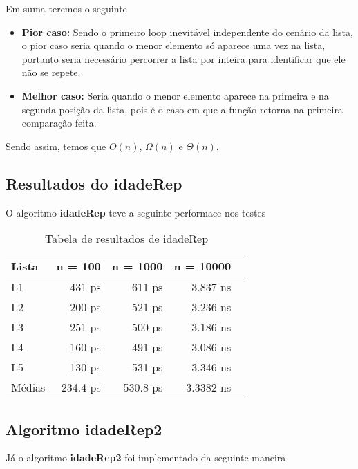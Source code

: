 Em suma teremos o seguinte

\begin{itemize}
	\item \textbf{Pior caso:} Sendo o primeiro loop inevitável independente do cenário da lista, o pior caso seria quando o menor elemento só aparece uma vez na lista, portanto seria necessário percorrer a lista por inteira para identificar que ele não se repete.

	\item \textbf{Melhor caso:} Seria quando o menor elemento aparece na primeira e na segunda posição da lista, pois é o caso em que a função retorna na primeira comparação feita.
\end{itemize}

Sendo assim, temos que $O(n)$, $\Omega(n)$ e $\Theta(n)$.

\subsection{Resultados do idadeRep}

O algoritmo \textbf{idadeRep} teve a seguinte performace nos testes

\begin{table}[h!]
	\centering
	\caption{Tabela de resultados de idadeRep}
	\label{tab:idade_rep_result}
	\begin{tabular}{lrrrr}
		\toprule
		Lista   & n = 100   & n = 1000  & n = 10000 \\
		\midrule
		L1      & 431 ps    & 611 ps    & 3.837 ns  \\
		L2      & 200 ps    & 521 ps    & 3.236 ns  \\
		L3      & 251 ps    & 500 ps    & 3.186 ns  \\
		L4      & 160 ps    & 491 ps    & 3.086 ns  \\
		L5      & 130 ps    & 531 ps    & 3.346 ns  \\
		\midrule
		Médias  & 234.4 ps  & 530.8 ps  & 3.3382 ns \\
		\bottomrule
	\end{tabular}
\end{table}
\FloatBarrier

\subsection{Algoritmo idadeRep2}

Já o algoritmo \textbf{idadeRep2} foi implementado da seguinte maneira 

